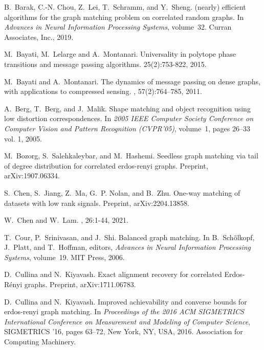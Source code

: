 \documentclass[11pt]{article}
\numberwithin{equation}{section}
\begin{document}
	\small
\small
\begin{thebibliography}{10}

B.~Barak, C.-N. Chou, Z.~Lei, T.~Schramm, and Y.~Sheng.
\newblock (nearly) efficient algorithms for the graph matching problem on correlated random graphs.
\newblock In {\em Advances in Neural Information Processing Systems}, volume~32. Curran Associates, Inc., 2019.

M.~Bayati, M.~Lelarge and A.~Montanari.
\newblock Universality in polytope phase transitions and message passing algorithms.
 25(2):753-822, 2015.

M.~Bayati and A.~Montanari.
\newblock The dynamics of message passing on dense graphs, with applications to compressed sensing.
, 57(2):764--785, 2011.

A.~Berg, T.~Berg, and J.~Malik.
\newblock Shape matching and object recognition using low distortion correspondences.
\newblock In {\em 2005 IEEE Computer Society Conference on Computer Vision and Pattern Recognition (CVPR'05)}, volume~1, pages 26--33 vol. 1, 2005.


M.~Bozorg, S.~Salehkaleybar, and M.~Hashemi.
\newblock Seedless graph matching via tail of degree distribution for correlated erdos-renyi graphs.
\newblock Preprint, arXiv:1907.06334.

S.~Chen, S.~Jiang, Z.~Ma, G.~P. Nolan, and B.~Zhu.
\newblock One-way matching of datasets with low rank signals.
\newblock Preprint, arXiv:2204.13858.
  
W.~Chen and W.~Lam.
, 26:1-44, 2021.

T.~Cour, P.~Srinivasan, and J.~Shi.
\newblock Balanced graph matching.
\newblock In B.~Sch\"{o}lkopf, J.~Platt, and T.~Hoffman, editors, {\em Advances in Neural Information Processing Systems}, volume~19. MIT Press, 2006.

D.~Cullina and N.~Kiyavash.
\newblock Exact alignment recovery for correlated {E}rdos-{R}\'enyi graphs.
\newblock Preprint, arXiv:1711.06783.

D.~Cullina and N.~Kiyavash.
\newblock Improved achievability and converse bounds for erdos-renyi graph matching.
\newblock In {\em Proceedings of the 2016 ACM SIGMETRICS International Conference on Measurement and Modeling of Computer Science}, SIGMETRICS '16, pages 63--72, New York, NY, USA, 2016. Association for Computing Machinery.


\end{thebibliography}
\end{document}
